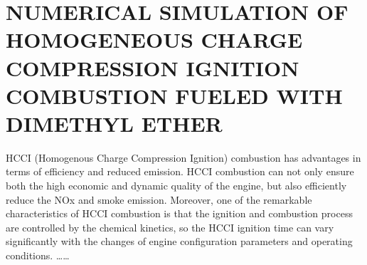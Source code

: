\documentclass[UTF8,a4paper,12pt]{ctexart}
\numberwithin{equation}{section}
\begin{document}
\newpage
{}
\fancyhead[RH]{}
\section*{NUMERICAL SIMULATION OF HOMOGENEOUS CHARGE COMPRESSION IGNITION COMBUSTION FUELED WITH DIMETHYL ETHER}%

\hspace{8mm}HCCI (Homogenous Charge Compression Ignition) combustion has advantages in terms of efficiency and reduced emission. HCCI combustion can not only ensure both the high economic and dynamic quality of the engine, but also efficiently reduce the NOx and smoke emission. Moreover, one of the remarkable characteristics of HCCI combustion is that the ignition and combustion process are controlled by the chemical kinetics, so the HCCI ignition time can vary significantly with the changes of engine configuration parameters and operating conditions. ……%
\end{document}
